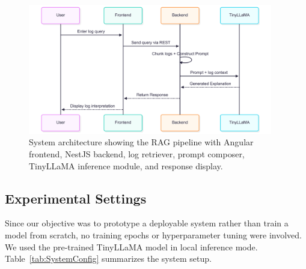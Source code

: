 \documentclass[conference]{IEEEtran}
\begin{document}
\begin{figure}[!ht]

\centering

\includegraphics[width=0.95\textwidth]{figures/architecture.png}

\caption{System architecture showing the RAG pipeline with Angular frontend, NestJS backend, log retriever, prompt composer, TinyLLaMA inference module, and response display.}

\label{Fig:SystemArchitecture}

\end{figure}

\subsection{Experimental Settings}

Since our objective was to prototype a deployable system rather than train a model from scratch, no training epochs or hyperparameter tuning were involved. We used the pre-trained TinyLLaMA model in local inference mode. Table~\ref{tab:SystemConfig} summarizes the system setup.
\end{document}
